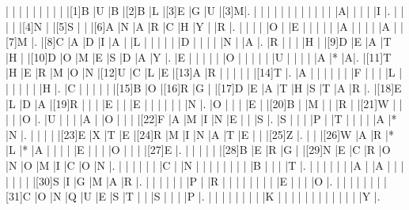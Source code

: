 \begin{Puzzle}{22}{22}
|{} |{} |{} |{} |{} |{} |{} |{} |{} |[1]B |U |B |[2]B |L |[3]E |G |U |[3]M|.
|{} |{} |{} |{} |{} |{} |{} |{} |{} |{} |{} |{} |A|{} |{} |{} |{} |I |.
|{} |{} |{} |{} |[4]N |{} |[5]S |{} |{} |[6]A |N |A |R |C |H |Y |{} |R |.
|{} |{} |{} |{} |O |{} |E |{} |{} |{} |{} |{} |A |{} |{} |{} |{} |A |{} |[7]M |.
|[8]C |A |D |I |A |{} |L |{} |{} |{} |{} |{} |D |{} |{} |{} |{} |N |{} |A |.
|R |{} |{} |{} |H |{} |[9]D |E |A |T |H |{} |[10]D |O |M |E |S |D |A |Y |.
|E |{} |{} |{} |{} |{} |O |{} |{} |{} |{} |{} |U |{} |{} |{} |{} |A |* |A|.
|[11]T |H |E |R |M |O |N |[12]U |C |L |E |[13]A |R |{} |{} |{} |{} |{} |[14]T |.
|A |{} |{} |{} |{} |{} |{} |F |{} |{} |{} |L |{} |{} |{} |{} |{} |{} |H |.
|C |{} |{} |{} |{} |{} |[15]B |O |[16]R |G |{} |[17]D |E |A |T |H |S |T |A |R |.
|[18]E |L |D |A |[19]R |{} |{} |{} |E |{} |{} |E |{} |{} |{} |{} |{} |{} |N |.
|O |{} |{} |{} |E |{} |[20]B |{} |M |{} |{} |R |{} |[21]W |{} |{} |{} |{} |O |.
|U |{} |{} |{} |A |{} |O |{} |{} |{} |[22]F |A |M |I |N |E |{} |{} |S |.
|S |{} |{} |{} |P |{} |T |{} |{} |{} |{} |A |* |N |. 
|{} |{} |{} |{} |[23]E |X |T |E |[24]R |M |I |N |A |T |E |{} |{} |[25]Z |.
|{} |{} |[26]W |A |R |* |L |* |A |{} |{} |{} |{} |E |{} |{} |{} |O |{} |{} |{} |[27]E |.
|{} |{} |{} |{} |{} |[28]B |E |R |G |{} |[29]N |E |C |R |O |N |O |M |I |C |O |N |.
|{} |{} |{} |{} |{} |{} |C |{} |N |{} |{} |{} |{} |{} |{} |{} |{} |B |{} |{} |{} |T |.
|{} |{} |{} |{} |{} |{} |A |{} |A |{} |{} |{} |{} |{} |{} |{} |[30]S |I |G |M |A |R |.
|{} |{} |{} |{} |{} |{} |P |{} |R |{} |{} |{} |{} |{} |{} |{} |{} |E |{} |{} |{} |O |.
|{} |{} |{} |{} |{} |{} |{} |[31]C |O |N |Q |U |E |S |T |{} |{} |S |{} |{} |{} |P |.
|{} |{} |{} |{} |{} |{} |{} |{} |K |{} |{} |{} |{} |{} |{} |{} |{} |{} |{} |{} |{} |Y |.
\end{Puzzle}

\newcommand{\blnk}{\underline{\hspace{2em}}}

